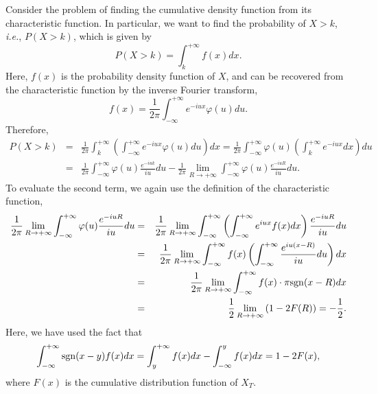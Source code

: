 \documentclass[12pt]{article}
\begin{document}
  Consider the problem of finding the cumulative density function from its characteristic function.
  In particular, we want to find the probability of $X>k$, {\it i.e.}, $P(X>k)$, which is given by
  \begin{equation}
    P(X > k)=\int_k^{+\infty}f(x)dx.
  \end{equation}
  Here, $f(x)$ is the probability density function of $X$, and can be recovered from the characteristic function
  by the inverse Fourier transform,
  \begin{equation}
    f(x)=\frac{1}{2\pi}\int_{-\infty}^{+\infty}e^{-iux}\varphi(u)du.
  \end{equation}
  Therefore,
  \begin{eqnarray}
    P(X > k)&=&\frac{1}{2\pi}\int_k^{+\infty} \left(\int_{-\infty}^{+\infty}e^{-iux}\varphi(u)du\right)dx
                        =\frac{1}{2\pi}\int_{-\infty}^{+\infty}\varphi(u) \left(\int_k^{+\infty}e^{-iux}dx\right)du\nonumber\\
                   &=&\frac{1}{2\pi}\int_{-\infty}^{+\infty}\varphi(u)\frac{e^{-iuk}}{iu}du
                        - \frac{1}{2\pi}\lim_{R\rightarrow +\infty}\int_{-\infty}^{+\infty}\varphi(u)\frac{e^{-iuR}}{iu}du.
  \end{eqnarray}
  To evaluate the second term, we again use the definition of the characteristic function,
  \begin{eqnarray}
    \frac{1}{2\pi}\lim_{R\rightarrow +\infty}\int_{-\infty}^{+\infty}\varphi(u)\frac{e^{-iuR}}{iu}du
    &=& \frac{1}{2\pi}\lim_{R\rightarrow +\infty}\int_{-\infty}^{+\infty}\left(\int_{-\infty}^{+\infty}e^{iux}f(x)dx\right)\frac{e^{-iuR}}{iu}du\nonumber\\
    &=& \frac{1}{2\pi}\lim_{R\rightarrow +\infty}\int_{-\infty}^{+\infty}f(x)\left(\int_{-\infty}^{+\infty}\frac{e^{iu(x-R)}}{iu}du\right)dx\nonumber\\
    &=& \frac{1}{2\pi}\lim_{R\rightarrow +\infty}\int_{-\infty}^{+\infty}f(x)\cdot\pi {\rm sgn}(x-R)dx\nonumber\\
    &=& \frac{1}{2}\lim_{R\rightarrow +\infty}\left(1-2F(R)\right) = -\frac{1}{2}.
  \end{eqnarray}
  Here, we have used the fact that
  \begin{equation}
    \int_{-\infty}^{+\infty}{\rm sgn}(x-y)f(x)dx=\int_y^{+\infty}f(x)dx - \int_{-\infty}^yf(x)dx = 1-2F(x),
  \end{equation}
  where $F(x)$ is the cumulative distribution function of $X_T$.
\end{document}
